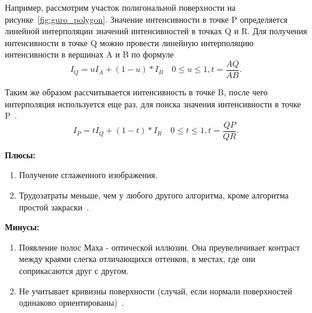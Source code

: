Например, рассмотрим участок полигональной поверхности на рисунке~\ref{fig:guro_polygon}.
Значение интенсивности в точке P
определяется линейной интерполяции значений интенсивностей в точках Q и R.
Для получения интенсивности в точке Q можно провести линейную интерполяцию интенсивности в вершинах A и B по формуле
\begin{equation} 
	I_Q = uI_A+(1-u)*I_B  \quad 0 \leq u \leq 1, t = \frac{AQ}{AB}.
	\label{eq:guro_inter_1}
\end{equation}

Таким же образом рассчитывается интенсивность в точке B, после чего интерполяция используется еще раз, для поиска значения интенсивности в точке P~\cite{Rodgers}.
\begin{equation} 
	I_P = tI_Q+(1-t)*I_R  \quad 0 \leq t \leq 1, t = \frac{QP}{QR}.
	\label{eq:guro_inter_2}
\end{equation}

\newpage

\textbf{Плюсы:}
\begin{enumerate}
	\item Получение сглаженного изображения.
	\item Трудозатраты меньше, чем у любого другого алгоритма, кроме алгоритма простой закраски~\cite{Rodgers}.
\end{enumerate}

\textbf{Минусы:}
\begin{enumerate}
	\item Появление полос Маха - оптической иллюзии. 
	Она преувеличивает контраст между краями слегка отличающихся оттенков, в местах, где они соприкасаются друг с другом.
	\item Не учитывает кривизны поверхности (случай, если нормали поверхностей одинаково ориентированы)~\cite{Rodgers}.
\end{enumerate}



